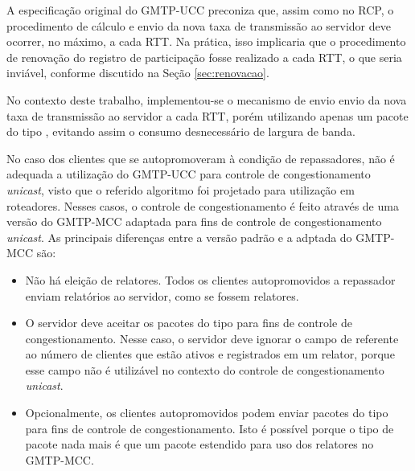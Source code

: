 A especificação original do GMTP-UCC preconiza que, assim como no RCP, o procedimento de cálculo e envio da nova taxa de transmissão ao servidor deve ocorrer, no máximo, a cada RTT.
Na prática, isso implicaria que o procedimento de renovação do registro de participação fosse realizado a cada RTT, o que seria inviável, conforme discutido na Seção \ref{sec:renovacao}.

No contexto deste trabalho, implementou-se o mecanismo de envio envio da nova taxa de transmissão ao servidor a cada RTT, porém utilizando apenas um pacote do tipo , evitando assim o consumo desnecessário de largura de banda. 

No caso dos clientes que se autopromoveram à condição de repassadores, não é adequada a utilização do GMTP-UCC para controle de congestionamento \textit{unicast}, visto que o referido algoritmo foi projetado para utilização em roteadores.
Nesses casos, o controle de congestionamento é feito através de uma versão do GMTP-MCC adaptada para fins de controle de congestionamento \textit{unicast}. As principais diferenças entre a versão padrão e a adptada do GMTP-MCC são:
\begin{itemize}
	\item Não há eleição de relatores. Todos os clientes autopromovidos a repassador enviam relatórios ao servidor, como se fossem relatores.
	\item O servidor deve aceitar os pacotes do tipo  para fins de controle de congestionamento. Nesse caso, o servidor deve ignorar o campo de  referente ao número de clientes que estão ativos e registrados em um relator, porque esse campo não é utilizável no contexto do controle de congestionamento \textit{unicast}.
	\item Opcionalmente, os clientes autopromovidos podem enviar pacotes do tipo  para fins de controle de congestionamento. Isto é possível porque o tipo de pacote  nada mais é que um pacote  estendido para uso dos relatores no GMTP-MCC.
\end{itemize}



